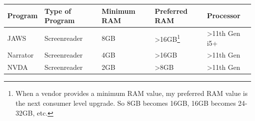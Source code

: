 \documentclass[14pt, letterpaper,twoside]{extreport}
\begin{document}
\begin{longtable}[]{@{}
    >{\raggedright\arraybackslash}p{}
    >{\raggedright\arraybackslash}p{}
    >{\raggedright\arraybackslash}p{}
    >{\raggedright\arraybackslash}p{}
    >{\raggedright\arraybackslash}p{}
    }
    \toprule\noalign{}
    \textbf{Program}                                                                                                                                                                                                                                                                                                                  & \textbf{Type of Program}                   & \textbf{Minimum RAM} & \textbf{Preferred RAM}                                                                                                                                                            & \textbf{Processor}       \\
    \midrule\noalign{}
    \endhead
    \bottomrule\noalign{}
    \endlastfoot
    JAWS                                                                                                                                                                                                                                                                                                                              & Screenreader                               & 8GB                  & \textgreater16GB\footnote{When a vendor provides a minimum RAM value, my preferred RAM value is the next consumer level upgrade. So 8GB becomes 16GB, 16GB becomes 24-32GB, etc.} & \textgreater11th Gen i5+ \\[1.5em] 
    Narrator                                                                                                                                                                                                                                                                                                                          & Screenreader                               & 4GB                  & \textgreater16GB                                                                                                                                                                  & \textgreater11th Gen     \\[1.5em] 
    NVDA                                                                                                                                                                                                                                                                                                                              & Screenreader                               & 2GB                  & \textgreater8GB                                                                                                                                                                   & \textgreater11th Gen     \\[1.5em] 

\end{longtable}
\end{document}
